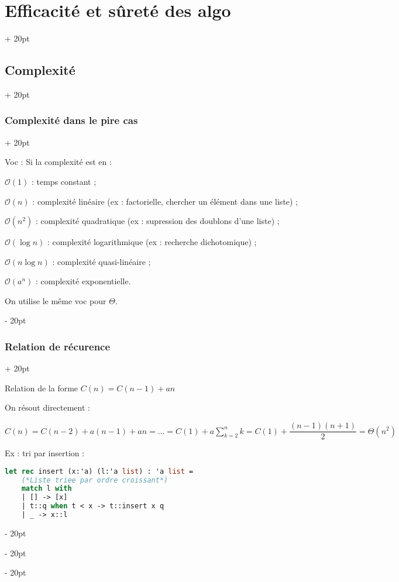 \documentclass[a4paper, 12pt, twoside]{article}
\newcommand{\ind}[1][20pt]{\advance\leftskip + #1}
\newcommand{\deind}[1][20pt]{\advance\leftskip - #1}
\newenvironment{indentedenv}[1][20pt]{\par \ind[#1]}{\par \deind}
\newenvironment{indt}[2][20pt]{#2 \begin{indentedenv}[#1]}{\end{indentedenv}} %
\begin{document}
\begin{indt}{\section{Efficacité et sûreté des algo}}
\begin{indt}{\subsection{Complexité}}
            \begin{indt}{\subsubsection{Complexité dans le pire cas}}
                
                Voc : Si la complexité est en :
                
                $\mathcal{O}(1)$ : temps constant ;
                
                $\mathcal{O}(n)$ : complexité linéaire (ex : factorielle, chercher un élément dans une liste) ;
                
                $\mathcal{O}(n^2)$ : complexité quadratique (ex : supression des doublons d'une liste) ;
                
                $\mathcal{O}(\log n)$ : complexité logarithmique (ex : recherche dichotomique) ;
                
                $\mathcal{O}(n\log n)$ : complexité quasi-linéaire ;
                
                $\mathcal{O}(a^n)$ : complexité exponentielle.
                
                On utilise le même voc pour $\Theta$.
                
            \end{indt}
            
            \vspace{12pt}
            
            \begin{indt}{\subsubsection{Relation de récurence}}
                
                Relation de la forme $C(n) = C(n - 1) + an$
                
                On résout directement :
                
                $\displaystyle C(n) = C(n - 2) + a(n - 1) + an = ... = C(1) + a \sum_{k = 2}^n k = C(1) + \dfrac{(n - 1)(n + 1)}{2} = \Theta(n^2)$
                
                Ex : tri par insertion :
                
                \begin{lstlisting}[language=Caml, xleftmargin=80pt]
let rec insert (x:'a) (l:'a list) : 'a list =
    (*Liste triee par ordre croissant*)
    match l with
    | [] -> [x]
    | t::q when t < x -> t::insert x q
    | _ -> x::l


\end{lstlisting}
\end{indt}
\end{indt}
\end{indt}
\end{document}
